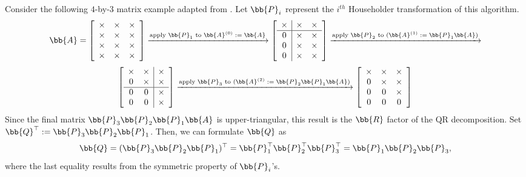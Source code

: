 Consider the following $4$-by-$3$ matrix example adapted from \cite{Higham2002}. 
Let $\bb{P}_i$ represent the $i^{th}$ Householder transformation of this algorithm. 
\[\bb{A} = \left[ \begin{array}{ccc}
\times & \times & \times \\
\times & \times & \times \\
\times & \times & \times \\
\times & \times & \times
\end{array}
\right]\xrightarrow{\text{apply $\bb{P}_1$ to $\bb{A}^{(0)}:=\bb{A}$}}\left[ \begin{array}{c|cc}
\times & \times & \times \\ \hline
0 & \times & \times \\
0 & \times & \times \\
0 & \times & \times
\end{array}
\right]
\xrightarrow{\text{apply $\bb{P}_2$ to ($\bb{A}^{(1)}:=\bb{P}_1\bb{A}$)}}\]
\[ \left[
\begin{array}{cc|c}
\times & \times & \times \\
0 & \times & \times \\ \hline
0 & 0 & \times \\
0 & 0 & \times 
\end{array} \right]
\xrightarrow{\text{apply $\bb{P}_3$ to ($\bb{A}^{(2)}:=\bb{P}_2\bb{P}_1\bb{A}$)}} \left[ \begin{array}{ccc}
\times & \times & \times \\
0 & \times & \times \\
0 & 0 & \times \\
0 & 0 & 0 
\end{array}\right] \] 
Since the final matrix $ \bb{P}_3\bb{P}_2\bb{P}_1\bb{A}$ is upper-triangular, this result is the $\bb{R}$ factor of the QR decomposition.
Set $\bb{Q}^{\top}:=\bb{P}_3\bb{P}_2\bb{P}_1$. 
Then, we can formulate  $\bb{Q}$ as
$$
\bb{Q} = (\bb{P}_3\bb{P}_2\bb{P}_1)^{\top} = \bb{P}_1^{\top}\bb{P}_2^{\top}\bb{P}_3^{\top} = \bb{P}_1\bb{P}_2\bb{P}_3,
$$
where the last equality results from the symmetric property of $\bb{P}_i$'s. 

